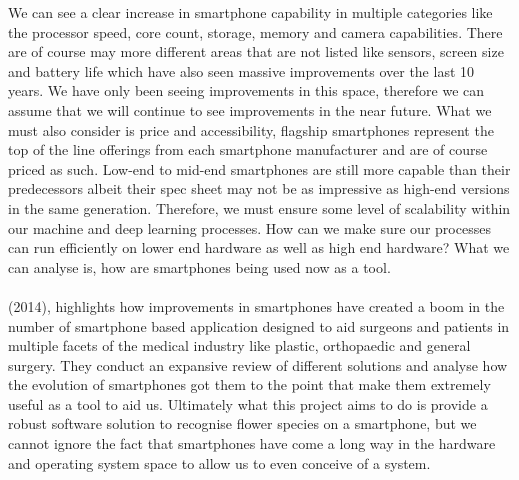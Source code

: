 \documentclass{article}
\begin{document}
\break
We can see a clear increase in smartphone capability in multiple categories like the processor speed, core count, 
storage, memory and camera capabilities. There are of course may more different areas that are not listed like sensors, 
screen size and battery life which have also seen massive improvements over the last 10 years. We have only been seeing 
improvements in this space, therefore we can assume that we will continue to see improvements in the near future. 
What we must also consider is price and accessibility, flagship smartphones represent the top of the line offerings from
 each smartphone manufacturer and are of course priced as such. Low-end to mid-end smartphones are still more capable 
 than their predecessors albeit their spec sheet may not be as impressive as high-end versions in the same generation. 
 Therefore, we must ensure some level of scalability within our machine and deep learning processes. How can we make 
 sure our processes can run efficiently on lower end hardware as well as high end hardware? What we can analyse is, how 
 are smartphones being used now as a tool.
\\
\\
 \citeauthor{kulendran2014} (2014), highlights how improvements in smartphones have created a boom in the number of 
 smartphone based application designed to aid surgeons and patients in multiple facets of the medical industry like 
  plastic, orthopaedic
   and general surgery. They conduct an expansive review of different solutions and analyse how the evolution of 
   smartphones got them to the point that make them extremely useful as a tool to aid us. Ultimately what this project 
   aims to do is provide a robust software solution to recognise flower species on a smartphone, but we cannot ignore 
   the fact that smartphones have come a long way in the hardware and operating system space to allow us to even 
   conceive of a system.
\end{document}
